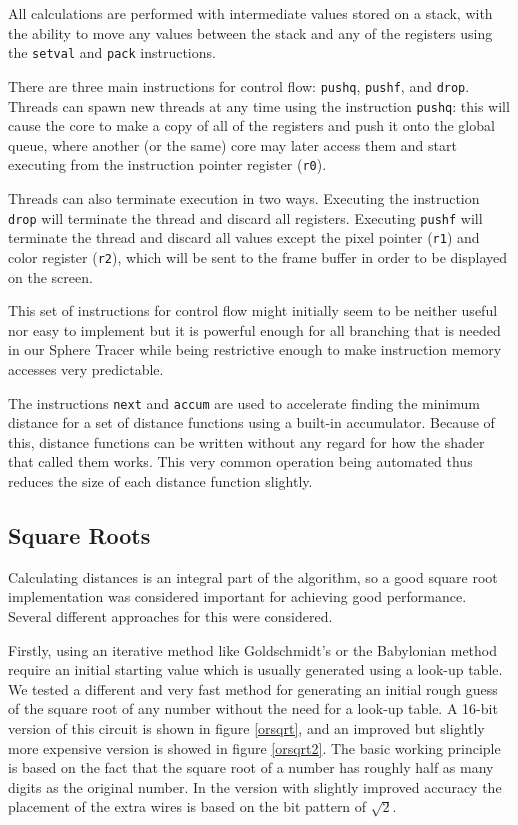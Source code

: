 			All calculations are performed with intermediate values stored on a
			stack, with the ability to move any values between the stack and
			any of the registers using the \texttt{setval} and \texttt{pack}
			instructions.

			There are three main instructions for control flow: \texttt{pushq},
			\texttt{pushf}, and \texttt{drop}. Threads can spawn new threads at
			any time using the instruction \texttt{pushq}: this will cause the
			core to make a copy of all of the registers and push it onto the
			global queue, where another (or the same) core may later access
			them and start executing from the instruction pointer register
			(\texttt{r0}).

			Threads can also terminate execution in two ways. Executing the
			instruction \texttt{drop} will terminate the thread and discard all
			registers. Executing \texttt{pushf} will terminate the thread and
			discard all values except the pixel pointer (\texttt{r1}) and color
			register (\texttt{r2}), which will be sent to the frame buffer in
			order to be displayed on the screen.

			This set of instructions for control flow might initially seem to be
			neither useful nor easy to implement but it is powerful enough for all
			branching that is needed in our Sphere Tracer while being restrictive
			enough to make instruction memory accesses very predictable.

			The instructions \texttt{next} and \texttt{accum} are used to accelerate
			finding the minimum distance for a set of distance functions using a
			built-in accumulator. Because of this, distance functions can be written
			without any regard for how the shader that called them works. This very
			common operation being automated thus reduces the size of each distance
			function slightly.

		\subsection{Square Roots}

			Calculating distances is an integral part of the algorithm, so a
			good square root implementation was considered important for
			achieving good performance. Several different approaches for this
			were considered.

			Firstly, using an iterative method like Goldschmidt's or the 
			Babylonian
			method require an initial starting value which is usually generated
			using a look-up table. We tested a different and very fast method for
			generating an initial rough guess of the square root of any number
			without the need for a look-up table. A 16-bit version of this circuit is
			shown in figure \ref{orsqrt}, and an improved but slightly more expensive
			version is showed in figure \ref{orsqrt2}. The basic working principle is
			based on the fact that the square root of a number has roughly half as
			many digits as the original number. In the version with slightly improved
			accuracy the placement of the extra wires is based on the bit pattern of
			$\sqrt{2}$.

